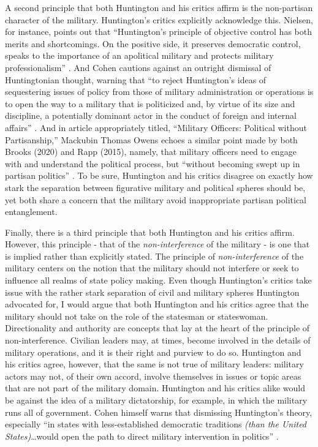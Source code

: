 \documentclass[
  12pt,
  oneside]{memoir}
\begin{document}
A second principle that both Huntington and his critics affirm is the non-partisan character of the military. Huntington's critics explicitly acknowledge this. Nielsen, for instance, points out that ``Huntington's principle of objective control has both merits and shortcomings. On the positive side, it preserves democratic control, speaks to the importance of an apolitical military and protects military professionalism'' \autocite[375]{nielsen_american_2012}. And Cohen cautions against an outright dismissal of Huntingtonian thought, warning that ``to reject Huntington's ideas of sequestering issues of policy from those of military administration or operations is to open the way to a military that is politicized and, by virtue of its size and discipline, a potentially dominant actor in the conduct of foreign and internal affairs'' \autocite[264]{cohen_supreme_2003}. And in article appropriately titled, ``Military Officers: Political without Partisanship,'' Mackubin Thomas Owens echoes a similar point made by both Brooks (2020) and Rapp (2015), namely, that military officers need to engage with and understand the political process, but ``without becoming swept up in partisan politics'' \autocite[97]{owens_military_2015}. To be sure, Huntington and his critics disagree on exactly how stark the separation between figurative military and political spheres should be, yet both share a concern that the military avoid inappropriate partisan political entanglement.

Finally, there is a third principle that both Huntington and his critics affirm. However, this principle - that of the \emph{non-interference} of the military - is one that is implied rather than explicitly stated. The principle of \emph{non-interference} of the military centers on the notion that the military should not interfere or seek to influence all realms of state policy making. Even though Huntington's critics take issue with the rather stark separation of civil and military spheres Huntington advocated for, I would argue that both Huntington and his critics agree that the military should not take on the role of the statesman or stateswoman. Directionality and authority are concepts that lay at the heart of the principle of non-interference. Civilian leaders may, at times, become involved in the details of military operations, and it is their right and purview to do so. Huntington and his critics agree, however, that the same is not true of military leaders: military actors may not, of their own accord, involve themselves in issues or topic areas that are not part of the military domain. Huntington and his critics alike would be against the idea of a military dictatorship, for example, in which the military runs all of government. Cohen himself warns that dismissing Huntington's theory, especially ``in states with less-established democratic traditions \emph{(than the United States)}\ldots would open the path to direct military intervention in politics'' \autocite[264, emphasis mine]{cohen_supreme_2003}.
\end{document}
